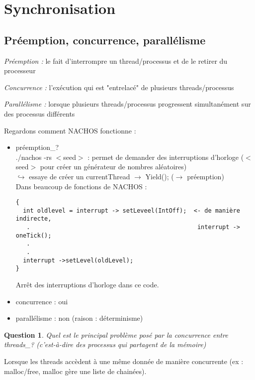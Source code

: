 \documentclass[12pt,a4paper]{report}
\newtheorem*{q}{Question}
\begin{document}
\section{Synchronisation}
\subsection{Préemption, concurrence, parallélisme}
\begin{description}
\item \textit{Préemption :} le fait d'interrompre un thread/processus et de le retirer du processeur
\item \textit{Concurrence :} l'exécution qui est "entrelacé" de plusieurs threads/processus
\item \textit{Parallélisme :} lorsque plusieurs threads/processus progressent simultanément sur des processus différents\\
\end{description}

Regardons comment NACHOS fonctionne :
\begin{itemize}
\item préemption_? \\
./nachos -rs $<$seed$>$ : permet de demander des interruptions d'horloge ($<$seed$>$ pour créer un générateur de nombres aléatoires)\\
$\hookrightarrow$ essaye de créer un currentThread $\rightarrow$ Yield(); ($\rightarrow$ préemption)\\

Dans beaucoup de fonctions de NACHOS :
\medskip
\begin{verbatim}
{
  int oldlevel = interrupt -> setLeveel(IntOff);  <- de manière indirecte,
   .                                               interrupt -> oneTick();
   .
   .
  interrupt ->setLevel(oldLevel);
}
\end{verbatim}
\medskip
Arrêt des interruptions d'horloge dans ce code. \\


\item concurrence : oui
\item parallélisme : non (raison : déterminisme)\\
\end{itemize}

\begin{q} Quel est le principal problème posé par la concurrence entre threads_? (c'est-à-dire des processus qui partagent de la mémoire)\end{q}
Lorsque les threads accèdent à une même donnée de manière concurrente (ex : malloc/free, malloc gère une liste de chainées).\\
\end{document}
